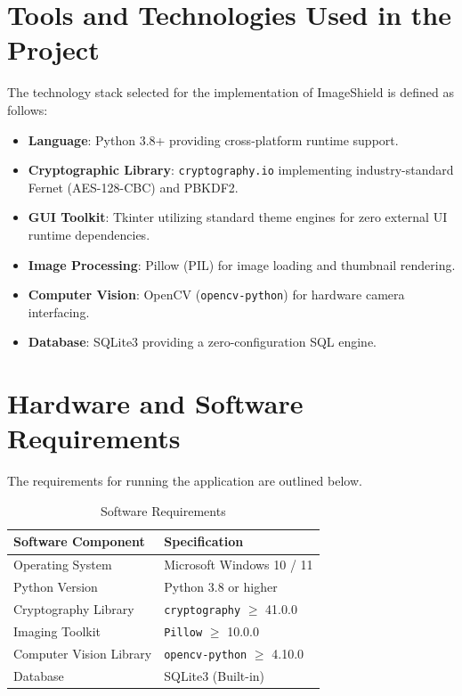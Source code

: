 \documentclass[12pt,a4paper]{report}
\begin{document}
\section{Tools and Technologies Used in the Project}
The technology stack selected for the implementation of ImageShield is defined as follows:
\begin{itemize}
    \item \textbf{Language}: Python 3.8+ providing cross-platform runtime support.
    \item \textbf{Cryptographic Library}: \texttt{cryptography.io} implementing industry-standard Fernet (AES-128-CBC) and PBKDF2.
    \item \textbf{GUI Toolkit}: Tkinter utilizing standard theme engines for zero external UI runtime dependencies.
    \item \textbf{Image Processing}: Pillow (PIL) for image loading and thumbnail rendering.
    \item \textbf{Computer Vision}: OpenCV (\texttt{opencv-python}) for hardware camera interfacing.
    \item \textbf{Database}: SQLite3 providing a zero-configuration SQL engine.
\end{itemize}

\section{Hardware and Software Requirements}
The requirements for running the application are outlined below.

\begin{table}[h]
\centering
\caption{Software Requirements}
\begin{tabular}{|m{5cm}|m{8cm}|}
\hline
\textbf{Software Component} & \textbf{Specification} \\ \hline
Operating System & Microsoft Windows 10 / 11 \\ \hline
Python Version & Python 3.8 or higher \\ \hline
Cryptography Library & \texttt{cryptography} $\ge$ 41.0.0 \\ \hline
Imaging Toolkit & \texttt{Pillow} $\ge$ 10.0.0 \\ \hline
Computer Vision Library & \texttt{opencv-python} $\ge$ 4.10.0 \\ \hline
Database & SQLite3 (Built-in) \\ \hline
\end{tabular}
\end{table}
\end{document}
